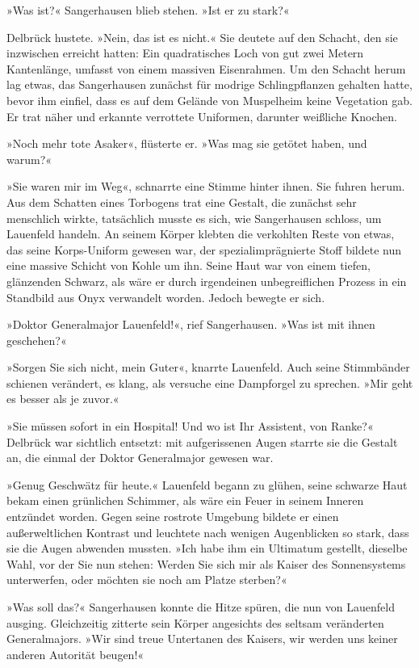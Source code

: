 »Was ist?« Sangerhausen blieb stehen. »Ist er zu stark?«

Delbrück hustete. »Nein, das ist es nicht.« Sie deutete auf den
Schacht, den sie inzwischen erreicht hatten: Ein quadratisches Loch
von gut zwei Metern Kantenlänge, umfasst von einem massiven
Eisenrahmen. Um den Schacht herum lag etwas, das Sangerhausen
zunächst für modrige Schlingpflanzen gehalten hatte, bevor ihm
einfiel, dass es auf dem Gelände von Muspelheim keine Vegetation
gab. Er trat näher und erkannte verrottete Uniformen, darunter
weißliche Knochen.

»Noch mehr tote Asaker«, flüsterte er. »Was mag sie getötet haben,
und warum?«

»Sie waren mir im Weg«, schnarrte eine Stimme hinter ihnen. Sie
fuhren herum. Aus dem Schatten eines Torbogens trat eine Gestalt,
die zunächst sehr menschlich wirkte, tatsächlich musste es sich,
wie Sangerhausen schloss, um Lauenfeld handeln. An seinem Körper
klebten die verkohlten Reste von etwas, das seine Korps-Uniform
gewesen war, der spezialimprägnierte Stoff bildete nun eine massive
Schicht von Kohle um ihn. Seine Haut war von einem tiefen,
glänzenden Schwarz, als wäre er durch irgendeinen unbegreiflichen
Prozess in ein Standbild aus Onyx verwandelt worden. Jedoch bewegte
er sich.

»Doktor Generalmajor Lauenfeld!«, rief Sangerhausen. »Was ist mit
ihnen geschehen?«

»Sorgen Sie sich nicht, mein Guter«, knarrte Lauenfeld. Auch seine
Stimmbänder schienen verändert, es klang, als versuche eine
Dampforgel zu sprechen. »Mir geht es besser als je zuvor.«

»Sie müssen sofort in ein Hospital! Und wo ist Ihr Assistent, von
Ranke?« Delbrück war sichtlich entsetzt: mit aufgerissenen Augen
starrte sie die Gestalt an, die einmal der Doktor Generalmajor
gewesen war.

»Genug Geschwätz für heute.« Lauenfeld begann zu glühen, seine
schwarze Haut bekam einen grünlichen Schimmer, als wäre ein Feuer
in seinem Inneren entzündet worden. Gegen seine rostrote Umgebung
bildete er einen außerweltlichen Kontrast und leuchtete nach
wenigen Augenblicken so stark, dass sie die Augen abwenden mussten.
»Ich habe ihm ein Ultimatum gestellt, dieselbe Wahl, vor der Sie
nun stehen: Werden Sie sich mir als Kaiser des Sonnensystems
unterwerfen, oder möchten sie noch am Platze sterben?«

»Was soll das?« Sangerhausen konnte die Hitze spüren, die nun von
Lauenfeld ausging. Gleichzeitig zitterte sein Körper angesichts des
seltsam veränderten Generalmajors. »Wir sind treue Untertanen des
Kaisers, wir werden uns keiner anderen Autorität beugen!«

